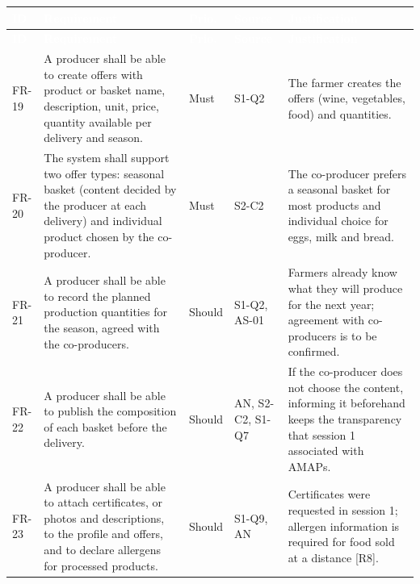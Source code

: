 \documentclass[11pt,a4paper]{article}
\begin{document}
{\footnotesize
\begin{longtable}{>{\raggedright\arraybackslash\hspace{0pt}}p{}>{\raggedright\arraybackslash\hspace{0pt}}p{}>{\raggedright\arraybackslash\hspace{0pt}}p{}>{\raggedright\arraybackslash\hspace{0pt}}p{}>{\raggedright\arraybackslash\hspace{0pt}}p{}}
\rowcolor{hdr}\textcolor{white}{\textbf{ID}} & \textcolor{white}{\textbf{Requirement}} & \textcolor{white}{\textbf{Prio.}} & \textcolor{white}{\textbf{Source}} & \textcolor{white}{\textbf{Justification}} \\ \endfirsthead
\rowcolor{hdr}\textcolor{white}{\textbf{ID}} & \textcolor{white}{\textbf{Requirement}} & \textcolor{white}{\textbf{Prio.}} & \textcolor{white}{\textbf{Source}} & \textcolor{white}{\textbf{Justification}} \\ \endhead
FR-19 & A producer shall be able to create offers with product or basket name, description, unit, price, quantity available per delivery and season. & Must & S1-Q2 & The farmer creates the offers (wine, vegetables, food) and quantities. \\ \hline
FR-20 & The system shall support two offer types: seasonal basket (content decided by the producer at each delivery) and individual product chosen by the co-producer. & Must & S2-C2 & The co-producer prefers a seasonal basket for most products and individual choice for eggs, milk and bread. \\ \hline
FR-21 & A producer shall be able to record the planned production quantities for the season, agreed with the co-producers. & Should & S1-Q2, AS-01 & Farmers already know what they will produce for the next year; agreement with co-producers is to be confirmed. \\ \hline
FR-22 & A producer shall be able to publish the composition of each basket before the delivery. & Should & AN, S2-C2, S1-Q7 & If the co-producer does not choose the content, informing it beforehand keeps the transparency that session 1 associated with AMAPs. \\ \hline
FR-23 & A producer shall be able to attach certificates, or photos and descriptions, to the profile and offers, and to declare allergens for processed products. & Should & S1-Q9, AN & Certificates were requested in session 1; allergen information is required for food sold at a distance [R8]. \\ \hline
\end{longtable}}
\addtocounter{table}{-1}
\end{document}
